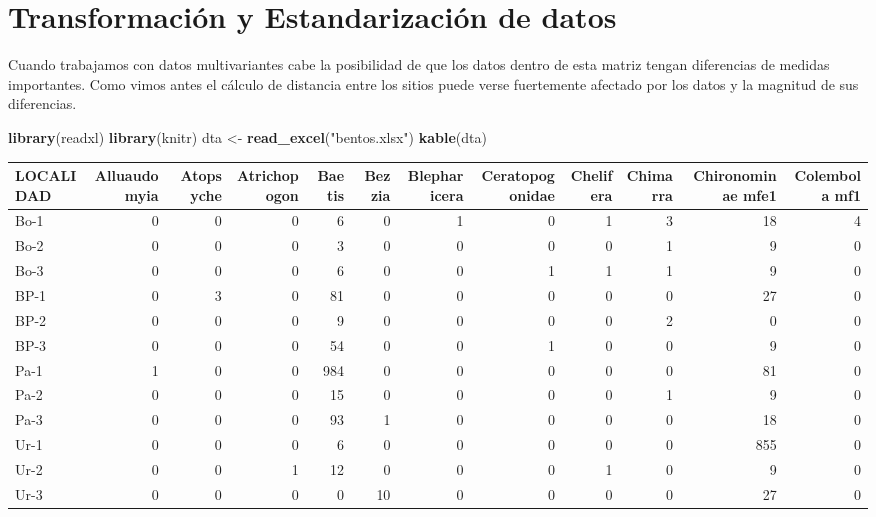 \documentclass[]{book}
\newenvironment{Shaded}{\begin{snugshade}}{\end{snugshade}}
\newcommand{\KeywordTok}[1]{\textcolor[rgb]{0.13,0.29,0.53}{\textbf{{#1}}}}
\newcommand{\StringTok}[1]{\textcolor[rgb]{0.31,0.60,0.02}{{#1}}}
\newcommand{\NormalTok}[1]{{#1}}
\begin{document}
\section{Transformación y Estandarización de
datos}\label{transformacion-y-estandarizacion-de-datos}

Cuando trabajamos con datos multivariantes cabe la posibilidad de que
los datos dentro de esta matriz tengan diferencias de medidas
importantes. Como vimos antes el cálculo de distancia entre los sitios
puede verse fuertemente afectado por los datos y la magnitud de sus
diferencias.

\begin{Shaded}
\begin{Highlighting}[]
\KeywordTok{library}\NormalTok{(readxl)}
\KeywordTok{library}\NormalTok{(knitr)}
\NormalTok{dta <-}\StringTok{ }\KeywordTok{read_excel}\NormalTok{(}\StringTok{"bentos.xlsx"}\NormalTok{)}
\KeywordTok{kable}\NormalTok{(dta)}
\end{Highlighting}
\end{Shaded}

\begin{tabular}{l|r|r|r|r|r|r|r|r|r|r|r}
\hline
LOCALIDAD & Alluaudomyia & Atopsyche & Atrichopogon & Baetis & Bezzia & Blepharicera & Ceratopogonidae & Chelifera & Chimarra & Chironominae mfe1 & Colembola mf1\\
\hline
Bo-1 & 0 & 0 & 0 & 6 & 0 & 1 & 0 & 1 & 3 & 18 & 4\\
\hline
Bo-2 & 0 & 0 & 0 & 3 & 0 & 0 & 0 & 0 & 1 & 9 & 0\\
\hline
Bo-3 & 0 & 0 & 0 & 6 & 0 & 0 & 1 & 1 & 1 & 9 & 0\\
\hline
BP-1 & 0 & 3 & 0 & 81 & 0 & 0 & 0 & 0 & 0 & 27 & 0\\
\hline
BP-2 & 0 & 0 & 0 & 9 & 0 & 0 & 0 & 0 & 2 & 0 & 0\\
\hline
BP-3 & 0 & 0 & 0 & 54 & 0 & 0 & 1 & 0 & 0 & 9 & 0\\
\hline
Pa-1 & 1 & 0 & 0 & 984 & 0 & 0 & 0 & 0 & 0 & 81 & 0\\
\hline
Pa-2 & 0 & 0 & 0 & 15 & 0 & 0 & 0 & 0 & 1 & 9 & 0\\
\hline
Pa-3 & 0 & 0 & 0 & 93 & 1 & 0 & 0 & 0 & 0 & 18 & 0\\
\hline
Ur-1 & 0 & 0 & 0 & 6 & 0 & 0 & 0 & 0 & 0 & 855 & 0\\
\hline
Ur-2 & 0 & 0 & 1 & 12 & 0 & 0 & 0 & 1 & 0 & 9 & 0\\
\hline
Ur-3 & 0 & 0 & 0 & 0 & 10 & 0 & 0 & 0 & 0 & 27 & 0\\
\hline
\end{tabular}
\end{document}
